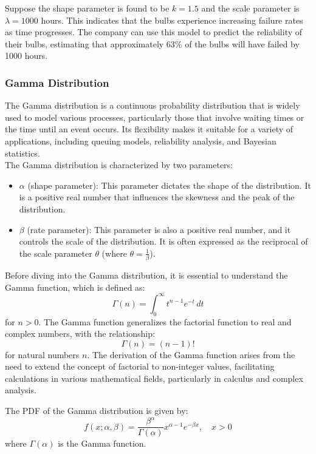     \begin{example}
        Suppose the shape parameter is found to be $k=1.5$ and the scale parameter is $\lambda=1000$ hours. This indicates that the bulbs experience increasing failure rates as time progresses. The company can use this model to predict the reliability of their bulbs, estimating that approximately 63\% of the bulbs will have failed by 1000 hours.
    \end{example}

\subsubsection{Gamma Distribution}

The Gamma distribution is a continuous probability distribution that is widely used to model various processes, particularly those that involve waiting times or the time until an event occurs. Its flexibility makes it suitable for a variety of applications, including queuing models, reliability analysis, and Bayesian statistics.\\

The Gamma distribution is characterized by two parameters: 
\begin{itemize}
    \item \(\alpha\) (shape parameter): This parameter dictates the shape of the distribution. It is a positive real number that influences the skewness and the peak of the distribution.
    \item \(\beta\) (rate parameter): This parameter is also a positive real number, and it controls the scale of the distribution. It is often expressed as the reciprocal of the scale parameter \(\theta\) (where \(\theta = \frac{1}{\beta}\)).
\end{itemize}

Before diving into the Gamma distribution, it is essential to understand the Gamma function, which is defined as:
\[
\Gamma(n) = \int_0^\infty t^{n-1} e^{-t} \, dt
\]
for \( n > 0 \). The Gamma function generalizes the factorial function to real and complex numbers, with the relationship:
\[
\Gamma(n) = (n-1)!
\]
for natural numbers \( n \). The derivation of the Gamma function arises from the need to extend the concept of factorial to non-integer values, facilitating calculations in various mathematical fields, particularly in calculus and complex analysis.

\begin{definition}
    The PDF of the Gamma distribution is given by:
\[
f(x; \alpha, \beta) = \frac{\beta^\alpha}{\Gamma(\alpha)} x^{\alpha-1} e^{-\beta x}, \quad x > 0
\]
where \(\Gamma(\alpha)\) is the Gamma function.
\end{definition}

